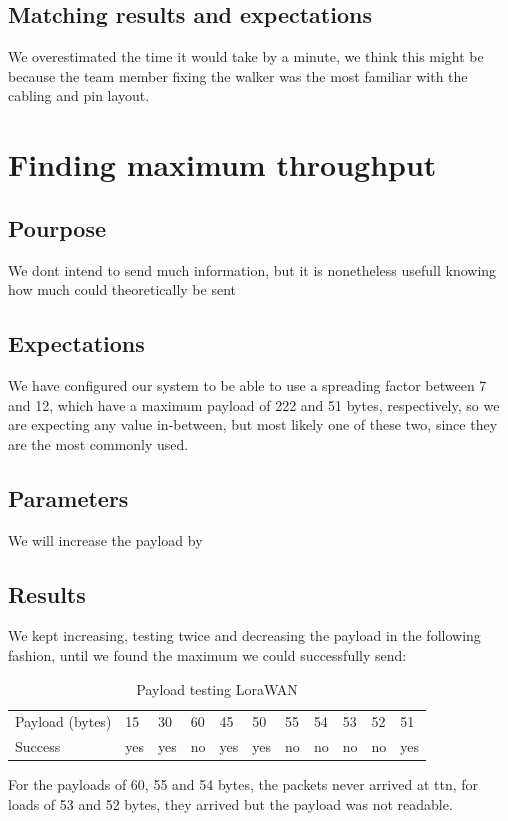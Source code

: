 	\subsection{Matching results and expectations}
		We overestimated the time it would take by a minute, we think this might be because the team member fixing the walker was the most familiar with the cabling and pin layout.

\section{Finding maximum throughput}

	\subsection{Pourpose}
		We dont intend to send much information, but it is nonetheless usefull knowing how much could theoretically be sent
	\subsection{Expectations}
		We have configured our system to be able to use a spreading factor between 7 and 12, which have a maximum payload of 222 and 51 bytes, respectively, so we are expecting any value in-between, but most likely one of these two, since they are the most commonly used.
	\subsection{Parameters}
		We will increase the payload by 
	\subsection{Results}
		We kept increasing, testing twice and decreasing the payload in the following fashion, until we found the maximum we could successfully send:

		\begin{table}[h]
			\begin{tabular}{@{}lllllllllll@{}}
				Payload (bytes) & 15  & 30  & 60 & 45  & 50  & 55 & 54 & 53 & 52 & 51  \\
				Success & yes & yes & no & yes & yes & no & no & no & no & yes
			\end{tabular}
			\caption[Payload testing LoraWAN]{Payload testing LoraWAN}
			\label{tab:LoraWanPayload}
		\end{table}

		For the payloads of 60, 55 and 54 bytes, the packets never arrived at ttn, for loads of 53 and 52 bytes, they arrived but the payload was not readable.

